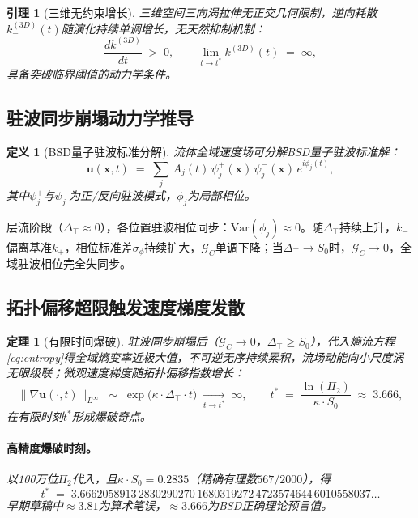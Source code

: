 \documentclass[11pt,a4paper]{ctexart}
\newtheorem{theorem}{定理}
\newtheorem{lemma}{引理}
\newtheorem{definition}{定义}
\theoremstyle{remark}
\newcommand{\PiT}{\Pi_{2}}
\newcommand{\kplus}{k_{+}}
\newcommand{\kminus}{k_{-}}
\newcommand{\Szero}{S_{0}}
\newcommand{\GC}{\mathcal{G}_{\!C}}
\newcommand{\Dtop}{\Delta_{\!\top}}
\newcommand{\uvec}{\bm{u}}
\begin{document}
\begin{lemma}[三维无约束增长]\label{lem:3d}
三维空间三向涡拉伸无正交几何限制，逆向耗散$\kminus^{(3D)}(t)$随演化持续单调增长，无天然抑制机制：
\begin{equation}\label{eq:3d-growth}
\frac{d\kminus^{(3D)}}{dt} \;>\; 0, \qquad \lim_{t\to t^{*}}\kminus^{(3D)}(t)\;=\;\infty,
\end{equation}
具备突破临界阈值的动力学条件。
\end{lemma}

\subsection{驻波同步崩塌动力学推导}\label{sec:decoherence}

\begin{definition}[BSD量子驻波标准分解]\label{def:swd}
流体全域速度场可分解BSD量子驻波标准解：
\begin{equation}\label{eq:swd}
\uvec(\bm{x},t) \;=\; \sum_{j}\,A_{j}(t)\,\psi_{j}^{+}(\bm{x})\,\psi_{j}^{-}(\bm{x})\,e^{i\phi_{j}(t)},
\end{equation}
其中$\psi_{j}^{+}$与$\psi_{j}^{-}$为正/反向驻波模式，$\phi_{j}$为局部相位。
\end{definition}

层流阶段（$\Dtop\approx 0$），各位置驻波相位同步：$\mathrm{Var}(\phi_{j})\approx 0$。随$\Dtop$持续上升，$\kminus$偏离基准$\kplus$，相位标准差$\sigma_{\phi}$持续扩大，$\GC$单调下降；当$\Dtop\to\Szero$时，$\GC\to 0$，全域驻波相位完全失同步。

\subsection{拓扑偏移超限触发速度梯度发散}\label{sec:blowup}

\begin{theorem}[有限时间爆破]\label{thm:blowup}
驻波同步崩塌后（$\GC\to 0$，$\Dtop\ge\Szero$），代入熵流方程\eqref{eq:entropy}得全域熵变率近极大值，不可逆无序持续累积，流场动能向小尺度涡无限级联；微观速度梯度随拓扑偏移指数增长：
\begin{equation}\label{eq:blowup}
\|\nabla\uvec(\cdot,t)\|_{L^{\infty}} \;\sim\; \exp\!\big(\kappa\cdot\Dtop\cdot t\big) \;\xrightarrow[t\to t^{*}]{}\; \infty,
\qquad t^{*} \;=\; \frac{\ln(\PiT)}{\kappa\cdot\Szero} \;\approx\; 3.666,
\end{equation}
在有限时刻$t^{*}$形成爆破奇点。

\paragraph{高精度爆破时刻。} 以100万位$\PiT$代入，且$\kappa\cdot\Szero=0.2835$（精确有理数$567/2000$），得
\begin{equation}\label{eq:tstar-highprec}
t^{*} \;=\; 3.6662058913\,2830290270\,1680319272\,4723574644\,6010558037\ldots
\end{equation}
早期草稿中$\approx 3.81$为算术笔误，$\approx 3.666$为BSD正确理论预言值。
\end{theorem}
\end{document}
